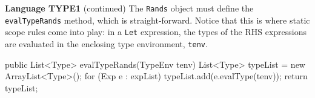 \begin{minipage}[t]{\sw}
\slidenumber
\LARGE
{\bf Language TYPE1} (continued)\exx
\Large
\Large
The \verb'Rands' object must define
the \verb'evalTypeRands' method, which is straight-forward.
Notice that this is where static scope rules come into play:
in a \verb'Let' expression, the types of the RHS expressions
are evaluated in the enclosing type environment, \verb'tenv'.
\begin{qv}
public List<Type> evalTypeRands(TypeEnv tenv) {
    List<Type> typeList = new ArrayList<Type>();
    for (Exp e : expList)
        typeList.add(e.evalType(tenv));
    return typeList;
}
\end{qv}
        
\end{minipage}
